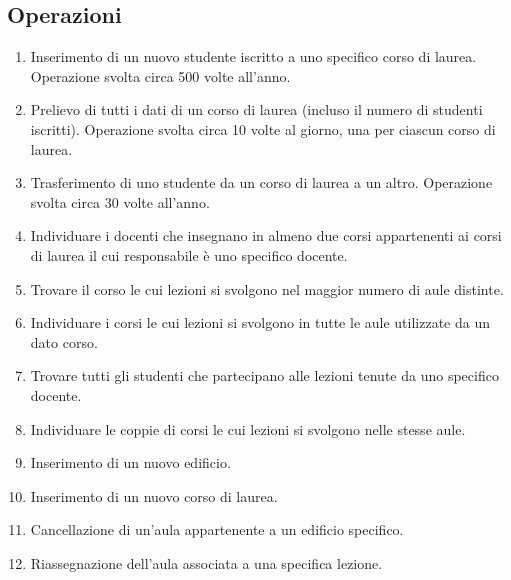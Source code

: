 \documentclass[a4paper,11pt]{article}
\begin{document}

\subsection{Operazioni}

\label{sec:operations}

\begin{enumerate}[label=\textbf{Operazione \arabic*}:, ref=\textbf{Operazione \arabic*}, leftmargin=*]
    \item Inserimento di un nuovo studente iscritto a uno specifico corso di laurea. Operazione svolta circa 500 volte all'anno.
    \label{op:insert_student}
    
    \item Prelievo di tutti i dati di un corso di laurea (incluso il numero di studenti iscritti). Operazione svolta circa 10 volte al giorno, una per ciascun corso di laurea.
    \label{op:get_info_degree}
    
    \item Trasferimento di uno studente da un corso di laurea a un altro. Operazione svolta circa 30 volte all'anno.
    \label{op:transfer_student}
    
    \item Individuare i docenti che insegnano in almeno due corsi appartenenti ai corsi di laurea il cui responsabile è uno specifico docente.
    \label{op:find_teachers_by_responsible}
    
    \item Trovare il corso le cui lezioni si svolgono nel maggior numero di aule distinte.
    \label{op:find_course_max_rooms}
    
    \item Individuare i corsi le cui lezioni si svolgono in tutte le aule utilizzate da un dato corso.
    \label{op:find_courses_covering_rooms}
    
    \item Trovare tutti gli studenti che partecipano alle lezioni tenute da uno specifico docente.
    \label{op:find_students_by_teacher}
    
    \item Individuare le coppie di corsi le cui lezioni si svolgono nelle stesse aule.
    \label{op:find_course_in_same_rooms}
    
    \item Inserimento di un nuovo edificio.
    \label{op:create_building}
    
    \item Inserimento di un nuovo corso di laurea.
    \label{op:create_degree}
    
    \item Cancellazione di un'aula appartenente a un edificio specifico.
    \label{op:remove_room}
    
    \item Riassegnazione dell'aula associata a una specifica lezione.
    \label{op:change_room_lesson}
\end{enumerate}
\end{document}

